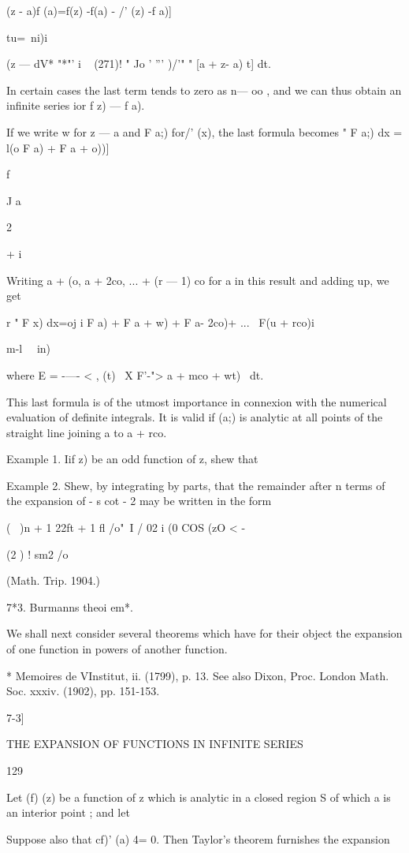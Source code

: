 (z - a)f (a)=f(z) -f(a) - /' (z) -f a)]

tu=\ ni)i

(z — dV* "*"' i ~ (271)! " Jo ' ''' )/'" " [a + z- a) t] dt.

In certain cases the last term tends to zero as n— oo , and we can
thus obtain an infinite series ior f z) — f a).

If we write w for z — a and F a;) for/' (x), the last formula becomes
" F a;) dx = l(o F a) + F a + o))]

f

J a

2

+ i

Writing a + (o, a + 2co, ... + (r — 1) co for a in this result and
adding up, we get

r " F x) dx=oj i F a) + F a + w) + F a- 2co)+ ... \ F(u + rco)i

m-l \ \ in)\

where E = -—- < , (t) \ X F'-"> a + mco + wt) \ dt.

This last formula is of the utmost importance in connexion with the
numerical evaluation of definite integrals. It is valid if (a;) is
analytic at all points of the straight line joining a to a + rco.

Example 1. Iif z) be an odd function of z, shew that

Example 2. Shew, by integrating by parts, that the remainder after n
terms of the expansion of - s cot - 2 may be written in the form

( \ )n + 1 22ft + 1 fl /o"\ I / 02 i (0 COS (zO < -

(2 ) ! sm2 /o

(Math. Trip. 1904.)

7*3. Burmanns theoi em*.

We shall next consider several theorems which have for their object
the expansion of one function in powers of another function.

* Memoires de VInstitut, ii. (1799), p. 13. See also Dixon, Proc.
London Math. Soc. xxxiv. (1902), pp. 151-153.

7-3]

THE EXPANSION OF FUNCTIONS IN INFINITE SERIES

129

Let (f) (z) be a function of z which is analytic in a closed region S
of which a is an interior point ; and let

Suppose also that cf)' (a) 4= 0. Then Taylor's theorem furnishes the
expansion

